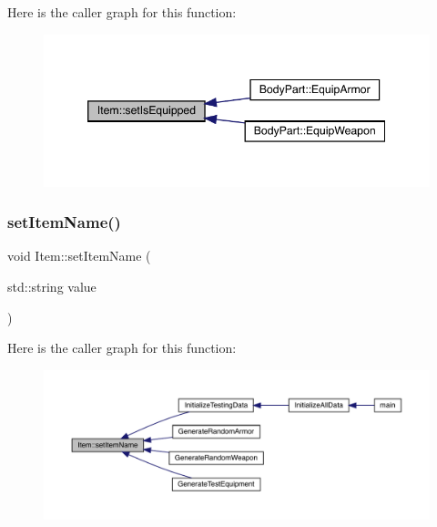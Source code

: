 Here is the caller graph for this function\+:
\nopagebreak
\begin{figure}[H]
\begin{center}
\leavevmode
\includegraphics[width=346pt]{dc/d32/class_item_ade0d63a4f02aa1a97f977b13f96eb891_icgraph}
\end{center}
\end{figure}
\mbox{\label{class_item_ae8dd38d585a7795f134f6453feb1000e}} 
\subsubsection{\texorpdfstring{set\+Item\+Name()}{setItemName()}}
{\footnotesize\ttfamily void Item\+::set\+Item\+Name (\begin{DoxyParamCaption}\item[{std\+::string}]{value }\end{DoxyParamCaption})}

Here is the caller graph for this function\+:
\nopagebreak
\begin{figure}[H]
\begin{center}
\leavevmode
\includegraphics[width=350pt]{dc/d32/class_item_ae8dd38d585a7795f134f6453feb1000e_icgraph}
\end{center}
\end{figure}
\mbox{\label{class_item_ae4c09d3c7d22b96a4bca5f530f5f3b42}} 
